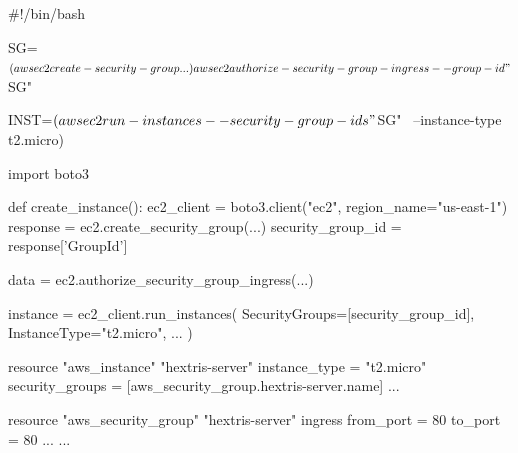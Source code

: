 \documentclass{slide}
\begin{document}
\begin{frame}[fragile]
\begin{code}[language=bash]{}
#!/bin/bash

SG=$(aws ec2 create-security-group ...)

aws ec2 authorize-security-group-ingress --group-id "$SG"

INST=$(aws ec2 run-instances --security-group-ids "$SG" \
         --instance-type t2.micro)
\end{code}
\end{frame}

\begin{frame}[fragile]
\begin{code}[language=python]{}
import boto3

def create_instance():
    ec2_client = boto3.client("ec2", region_name="us-east-1")
    response = ec2.create_security_group(...)
    security_group_id = response['GroupId']

    data = ec2.authorize_security_group_ingress(...)

    instance = ec2_client.run_instances(
        SecurityGroups=[security_group_id],
        InstanceType="t2.micro",
        ...
    )
\end{code}
\end{frame}

\begin{frame}[fragile]
\begin{code}[language=terraform]{}
resource "aws_instance" "hextris-server" {
    instance_type = "t2.micro"
    security_groups = [aws_security_group.hextris-server.name]
    ...
}

resource "aws_security_group" "hextris-server" {
    ingress {
        from_port = 80
        to_port = 80
        ...
    }
    ...
}
\end{code}
\end{frame}



\end{document}
